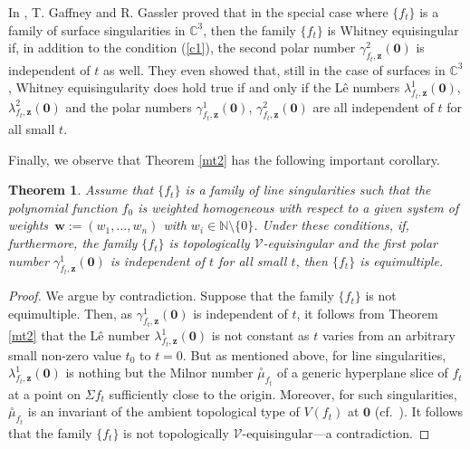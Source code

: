 \documentclass[a4paper,fleqn,11pt]{amsart}
\newtheorem{theorem}{Theorem}[section]
\theoremstyle{definition}
\theoremstyle{remark}
\numberwithin{equation}{section}
\begin{document}
In \cite[Corollary 6.6]{GG}, T. Gaffney and R. Gassler proved that in the special case where $\{f_t\}$ is a family of surface singularities in $\mathbb{C}^3$, then the family $\{f_t\}$ is Whitney equisingular if, in addition to the condition (\ref{c1}), the second polar number $\gamma^2_{f_t,\mathbf{z}}(\mathbf{0})$ is independent of $t$ as well. They even showed that, still in the case of surfaces in $\mathbb{C}^3$, Whitney equisingularity does hold true if and only if the L\^e numbers $\lambda^1_{f_t,\mathbf{z}}(\mathbf{0})$, $\lambda^2_{f_t,\mathbf{z}}(\mathbf{0})$ and the polar numbers $\gamma^1_{f_t,\mathbf{z}}(\mathbf{0})$, $\gamma^2_{f_t,\mathbf{z}}(\mathbf{0})$ are all independent of $t$ for all small $t$.

Finally, we observe that Theorem \ref{mt2} has the following important corollary.

\begin{theorem}\label{cmt2}
Assume that $\{f_t\}$ is a family of line singularities such that the polynomial function $f_0$ is weighted homogeneous with respect to a given system of weights~$\mathbf{w}:=(w_1,\ldots,w_n)$ with $w_i\in \mathbb{N}\setminus\{0\}$. 
Under these conditions, if, furthermore, the family $\{f_t\}$ is topologically $\mathscr{V}$-equisingular and the first polar number $\gamma^1_{f_t,\mathbf{z}} (\mathbf{0})$ is independent of $t$ for all small $t$, then $\{f_t\}$ is equimultiple.
\end{theorem}

\begin{proof}
We argue by contradiction. Suppose that the family $\{f_t\}$ is not equimultiple. Then, as $\gamma^1_{f_t,\mathbf{z}} (\mathbf{0})$ is independent of $t$, it follows from Theorem \ref{mt2} that the L\^e number $\lambda^1_{f_t,\mathbf{z}} (\mathbf{0})$ is not constant as $t$ varies from an arbitrary small non-zero value  $t_0$ to $t=0$. But as mentioned above, for line singularities, $\lambda^1_{f_t,\mathbf{z}} (\mathbf{0})$ is nothing but the Milnor number $\overset{\circ}{\mu}_{f_t}$ of a generic hyperplane slice of $f_t$ at a point on $\Sigma f_t$ sufficiently close to the origin. Moreover, for such singularities, $\overset{\circ}{\mu}_{f_t}$ is an invariant of the ambient topological type of $V(f_t)$ at $\mathbf{0}$ (cf.~\cite{M5,M7}). It follows that the family $\{f_t\}$ is not topologically $\mathscr{V}$-equisingular---a contradiction.
\end{proof}
\end{document}
